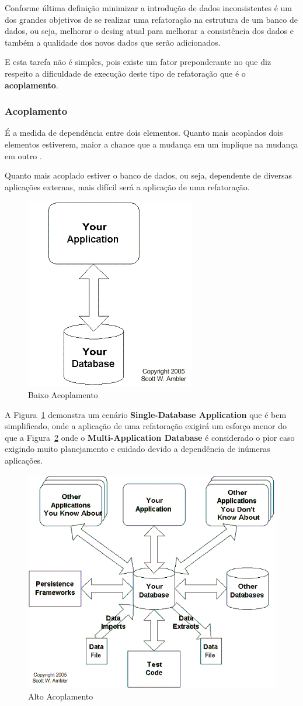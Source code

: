 \documentclass[10pt]{article}
\begin{document}
	Conforme última definição minimizar a introdução de dados inconsistentes é um dos grandes objetivos de se realizar uma refatoração na estrutura de um banco de dados, ou seja, melhorar o desing atual para melhorar a consistência dos dados e também a qualidade dos novos dados que serão adicionados.

	E esta tarefa não é simples, pois existe um fator preponderante no que diz respeito a dificuldade de execução deste tipo de refatoração que é o \textbf{acoplamento}.

\subsubsection{Acoplamento}
	É a medida de dependência entre dois elementos. Quanto mais acoplados dois elementos estiverem, maior a chance que a mudança em um implique na mudança em outro \cite{Wikipedia:Coupling}. 

	Quanto mais acoplado estiver o banco de dados, ou seja, dependente de diversas aplicações externas, mais difícil será a aplicação de uma refatoração\cite{Ambler:RefactoringDatabases}.
	
	\begin{figure}[ht]
		\centering
		\includegraphics[width=.3\textwidth]{img/dataRefactoringBestCase.png}
		\caption{Baixo Acoplamento}
		\label{figura:1}
	\end{figure}
	
	A Figura~\ref{figura:1} demonstra um cenário \textbf{Single-Database Application} que é bem simplificado, onde a aplicação de uma refatoração exigirá um esforço menor do que a Figura~\ref{figura:2} onde o \textbf{Multi-Application Database} é considerado o pior caso exigindo muito planejamento e cuidado devido a dependência de inúmeras aplicações.

	\begin{figure}[ht]
		\centering
		\includegraphics[width=.5\textwidth]{img/dataRefactoringWorstCase.png}
		\caption{Alto Acoplamento}
		\label{figura:2}
	\end{figure}
\end{document}
